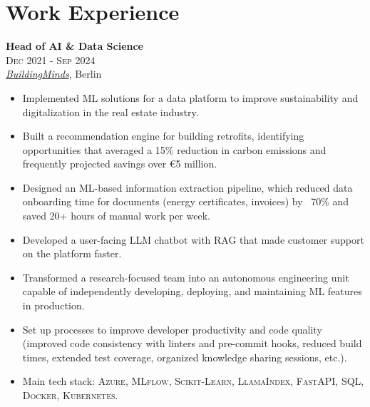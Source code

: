 \documentclass[a4paper,9.5pt]{article}
\begin{document}
\hfill
\begin{minipage}[t]{0.65\textwidth}

\section{Work Experience}

\small
\vspace{1.5mm}
\textbf{Head of AI \& Data Science}\\
\textsc{Dec 2021 - Sep 2024}\\
\emph{\href{https://buildingminds.com/}{BuildingMinds}}, Berlin
\vspace{2.5mm}
\begin{itemize}[leftmargin=1em, itemsep=1mm, parsep=0.5mm]
  \item Implemented ML solutions for a data platform to improve sustainability and digitalization in the real estate industry.
  \item Built a recommendation engine for building retrofits, identifying opportunities that averaged a 15\% reduction in carbon emissions and frequently projected savings over €5 million.
  \item Designed an ML-based information extraction pipeline, which reduced data onboarding time for documents (energy certificates, invoices) by ~70\% and saved 20+ hours of manual work per week.
  \item Developed a user-facing LLM chatbot with RAG that made customer support on the platform faster.
  \item Transformed a research-focused team into an autonomous engineering unit capable of independently developing, deploying, and maintaining ML features in production.
  \item Set up processes to improve developer productivity and code quality (improved code consistency with linters and pre-commit hooks, reduced build times, extended test coverage, organized knowledge sharing sessions, etc.).
  \item Main tech stack: \textsc{Azure}, \textsc{MLflow}, \textsc{Scikit-Learn}, \textsc{LlamaIndex}, \textsc{FastAPI}, \textsc{SQL}, \textsc{Docker}, \textsc{Kubernetes}.
\end{itemize}
\vspace{2mm}


\end{minipage}
\end{document}

